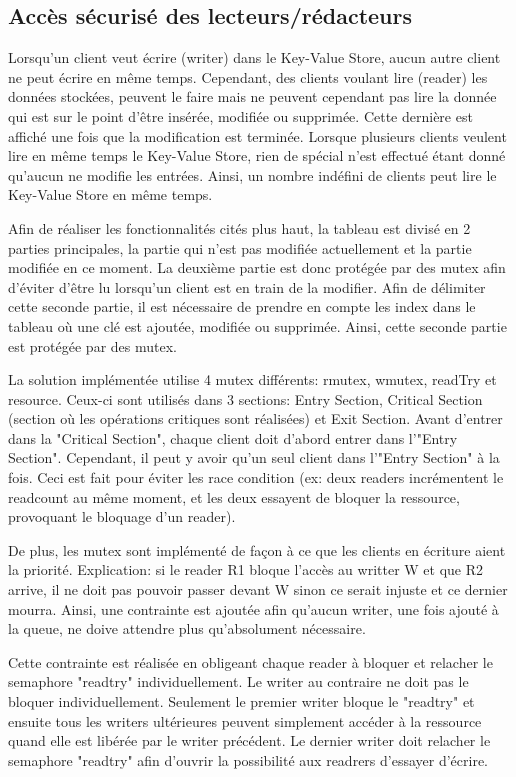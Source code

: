 \documentclass[11pt,a4paper]{article}
\begin{document}
\subsection{Accès sécurisé des lecteurs/rédacteurs \cite{Mutex}}
Lorsqu'un client veut écrire (writer) dans le Key-Value Store, aucun autre client ne peut écrire en même temps. Cependant, des clients voulant lire (reader) les données stockées, peuvent le faire mais ne peuvent cependant pas lire la donnée qui est sur le point d'être insérée, modifiée ou supprimée. Cette dernière est affiché une fois que la modification est terminée. Lorsque plusieurs clients veulent lire en même temps le Key-Value Store, rien de spécial n'est effectué étant donné qu'aucun ne modifie les entrées. Ainsi, un nombre indéfini de clients peut lire le Key-Value Store en même temps.

Afin de réaliser les fonctionnalités cités plus haut, la tableau est divisé en 2 parties principales, la partie qui n'est pas modifiée actuellement et la partie modifiée en ce moment. La deuxième partie est donc protégée par des mutex afin d'éviter d'être lu lorsqu'un client est en train de la modifier. Afin de délimiter cette seconde partie, il est nécessaire de prendre en compte les index dans le tableau où une clé est ajoutée, modifiée ou supprimée. Ainsi, cette seconde partie est protégée par des mutex. 

La solution implémentée utilise 4 mutex différents: rmutex, wmutex, readTry et resource. Ceux-ci sont utilisés dans 3 sections: Entry Section, Critical Section (section où les opérations critiques sont réalisées) et Exit Section. Avant d'entrer dans la "Critical Section", chaque client doit d'abord entrer dans l'"Entry Section". Cependant, il peut y avoir qu'un seul client dans l'"Entry Section" à la fois. Ceci est fait pour éviter les race condition (ex: deux readers incrémentent le readcount au même moment, et les deux essayent de bloquer la ressource, provoquant le bloquage d'un reader).

De plus, les mutex sont implémenté de façon à ce que les clients en écriture aient la priorité. Explication: si le reader R1 bloque l'accès au writter W et que R2 arrive, il ne doit pas pouvoir passer devant W sinon ce serait injuste et ce dernier mourra. Ainsi, une contrainte est ajoutée afin qu'aucun writer, une fois ajouté à la queue, ne doive attendre plus qu'absolument nécessaire. 

Cette contrainte est réalisée en obligeant chaque reader à bloquer et relacher le semaphore "readtry" individuellement. Le writer au contraire ne doit pas le bloquer individuellement. Seulement le premier writer bloque le "readtry" et ensuite tous les writers ultérieures peuvent simplement accéder à la ressource quand elle est libérée par le writer précédent. Le dernier writer doit relacher le semaphore "readtry" afin d'ouvrir la possibilité aux readrers d'essayer d'écrire. 
\end{document}
